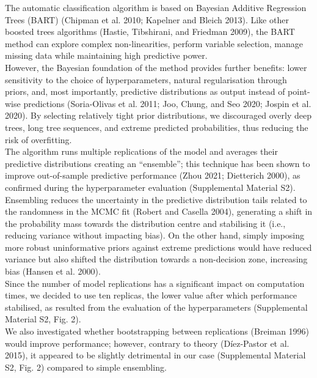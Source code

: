 \documentclass{article}
\begin{document}
The automatic classification algorithm is based on Bayesian Additive
Regression Trees (BART) (Chipman et al. 2010; Kapelner and Bleich 2013).
Like other boosted trees algorithms (Hastie, Tibshirani, and Friedman
2009), the BART method can explore complex non-linearities, perform
variable selection, manage missing data while maintaining high
predictive power.\\
However, the Bayesian foundation of the method provides further
benefits: lower sensitivity to the choice of hyperparameters, natural
regularisation through priors, and, most importantly, predictive
distributions as output instead of point-wise predictions (Soria-Olivas
et al. 2011; Joo, Chung, and Seo 2020; Jospin et al. 2020). By selecting
relatively tight prior distributions, we discouraged overly deep trees,
long tree sequences, and extreme predicted probabilities, thus reducing
the risk of overfitting.\\
The algorithm runs multiple replications of the model and averages their
predictive distributions creating an ``ensemble''; this technique has
been shown to improve out-of-sample predictive performance (Zhou 2021;
Dietterich 2000), as confirmed during the hyperparameter evaluation
(Supplemental Material S2). Ensembling reduces the uncertainty in the
predictive distribution tails related to the randomness in the MCMC fit
(Robert and Casella 2004), generating a shift in the probability mass
towards the distribution centre and stabilising it (i.e., reducing
variance without impacting bias). On the other hand, simply imposing
more robust uninformative priors against extreme predictions would have
reduced variance but also shifted the distribution towards a
non-decision zone, increasing bias (Hansen et al. 2000).\\
Since the number of model replications has a significant impact on
computation times, we decided to use ten replicas, the lower value after
which performance stabilised, as resulted from the evaluation of the
hyperparameters (Supplemental Material S2, Fig. 2).\\
We also investigated whether bootstrapping between replications (Breiman
1996) would improve performance; however, contrary to theory
(Díez-Pastor et al. 2015), it appeared to be slightly detrimental in our
case (Supplemental Material S2, Fig. 2) compared to simple ensembling.\\
\end{document}
